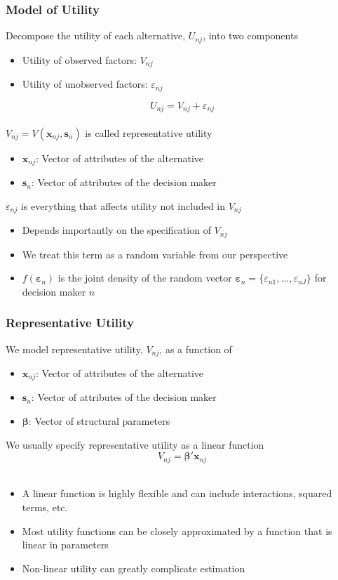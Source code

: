 \documentclass{beamer}\usepackage[]{graphicx}\usepackage[]{xcolor}
\begin{document}
\begin{frame}\frametitle{Model of Utility}
	Decompose the utility of each alternative, $U_{nj}$, into two components
	\begin{itemize}
		\item Utility of observed factors: $V_{nj}$
		\item Utility of unobserved factors: $\varepsilon_{nj}$
	\end{itemize}
	$$U_{nj} = V_{nj} + \varepsilon_{nj}$$ \\
	\vspace{2ex}
	$V_{nj} = V(\bm{x}_{nj}, \bm{s}_n)$ is called representative utility
	\begin{itemize}
		\item $\bm{x}_{nj}$: Vector of attributes of the alternative
		\item $\bm{s}_n$: Vector of attributes of the decision maker
	\end{itemize}
	\vspace{2ex}
	$\varepsilon_{nj}$ is everything that affects utility not included in $V_{nj}$
	\begin{itemize}
		\item Depends importantly on the specification of $V_{nj}$
		\item We treat this term as a random variable from our perspective
		\item $f(\bm{\varepsilon}_n)$ is the joint density of the random vector $\bm{\varepsilon}_n = \{\varepsilon_{n1}, \dots, \varepsilon_{nJ}\}$ for decision maker $n$
	\end{itemize}
\end{frame}

\begin{frame}\frametitle{Representative Utility}
  We model representative utility, $V_{nj}$, as a function of
  \begin{itemize}
		\item $\bm{x}_{nj}$: Vector of attributes of the alternative
		\item $\bm{s}_n$: Vector of attributes of the decision maker
		\item $\bm{\beta}$: Vector of structural parameters
	\end{itemize}
	\vspace{2ex}
	We usually specify representative utility as a linear function
    $$V_{nj} = \bm{\beta}' \bm{x}_{nj}$$ \\
    \begin{itemize}
    	\item A linear function is highly flexible and can include interactions, squared terms, etc.
    	\item Most utility functions can be closely approximated by a function that is linear in parameters
    	\item Non-linear utility can greatly complicate estimation
    \end{itemize}
\end{frame}
\end{document}
